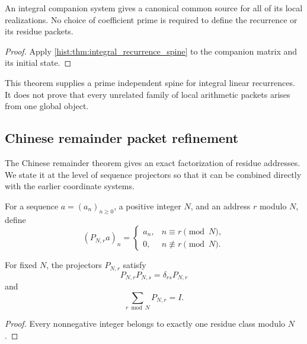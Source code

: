 \begin{histcorollary}\label{hist:cor:prime_independent_spine}
An integral companion system gives a canonical common source for all of its local realizations. No choice of coefficient prime is required to define the recurrence or its residue packets.
\end{histcorollary}

\begin{proof}
Apply \cref{hist:thm:integral_recurrence_spine} to the companion matrix and its initial state.
\end{proof}

\begin{histremark}\label{hist:rem:spine_boundary}
This theorem supplies a prime independent spine for integral linear recurrences. It does not prove that every unrelated family of local arithmetic packets arises from one global object.
\end{histremark}

\subsection{Chinese remainder packet refinement}\label{hist:sec:crt}

The Chinese remainder theorem gives an exact factorization of residue addresses. We state it at the level of sequence projectors so that it can be combined directly with the earlier coordinate systems.

\begin{histdefinition}\label{hist:def:residue_projector}
For a sequence \(a=(a_n)_{n\geq0}\), a positive integer \(N\), and an address \(r\) modulo \(N\), define
\[
(P_{N,r}a)_n
=
\begin{cases}
a_n,&n\equiv r\pmod N,\\
0,&n\not\equiv r\pmod N.
\end{cases}
\]
\end{histdefinition}

\begin{histproposition}\label{hist:prop:residue_packet_system}
For fixed \(N\), the projectors \(P_{N,r}\) satisfy
\[
P_{N,r}P_{N,s}
=
\delta_{rs}P_{N,r}
\]
and
\[
\boxed{
\sum_{r\bmod N}P_{N,r}=I.
}
\]
\end{histproposition}

\begin{proof}
Every nonnegative integer belongs to exactly one residue class modulo \(N\).
\end{proof}


